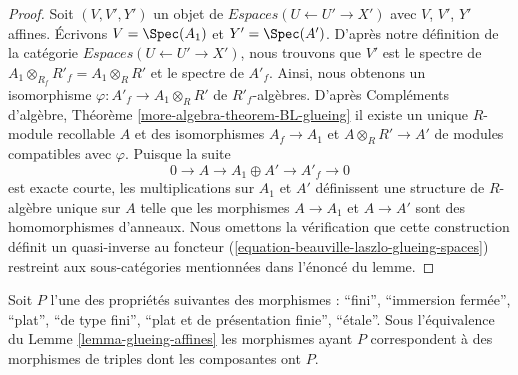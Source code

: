 \begin{proof}
Soit $(V, V', Y')$ un objet de
$\textit{Espaces}(U \leftarrow U' \to X')$
avec $V$, $V'$, $Y'$ affines.
Écrivons $V = \Spec(A_1)$ et $Y' = \Spec(A')$. D'après notre définition de la
catégorie $\textit{Espaces}(U \leftarrow U' \to X')$, nous trouvons que
$V'$ est le spectre de $A_1 \otimes_{R_f} R'_f = A_1 \otimes_R R'$
et le spectre de $A'_f$. Ainsi, nous obtenons un isomorphisme
$\varphi : A'_f \to A_1 \otimes_R R'$ de $R'_f$-algèbres.
D'après Compléments d'algèbre, Théorème \ref{more-algebra-theorem-BL-glueing}
il existe un unique $R$-module recollable $A$ et des isomorphismes
$A_f \to A_1$ et $A \otimes_R R' \to A'$ de modules compatibles avec
$\varphi$. Puisque la suite
$$
0 \to A \to A_1 \oplus A' \to A'_f \to 0
$$
est exacte courte, les multiplications sur $A_1$ et $A'$ définissent
une structure de $R$-algèbre unique sur $A$ telle que les morphismes $A \to A_1$
et $A \to A'$ sont des homomorphismes d'anneaux. Nous omettons la vérification que cette construction définit un quasi-inverse au foncteur
(\ref{equation-beauville-laszlo-glueing-spaces})
restreint aux sous-catégories mentionnées dans l'énoncé du lemme.
\end{proof}

\begin{lemma}
\label{lemma-glueing-affines-etale}
Soit $P$ l'une des propriétés suivantes des morphismes :
``fini'', ``immersion fermée'', ``plat'', ``de type fini'',
``plat et de présentation finie'', ``\'etale''.
Sous l'équivalence du Lemme \ref{lemma-glueing-affines}
les morphismes ayant $P$ correspondent à des morphismes de triples
dont les composantes ont $P$.
\end{lemma}

